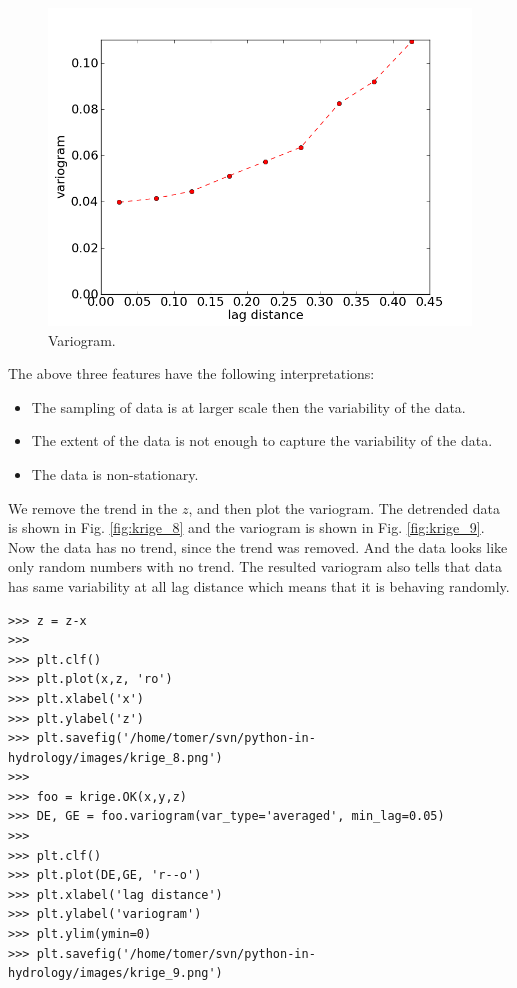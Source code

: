 \documentclass[10pt]{book}
\begin{document}
\beforefig
\begin{figure}[h!]
  \centering
    \includegraphics[scale=0.5]{images/krige_7.png}
  \caption{Variogram.}
   \label{fig:krige_7}
\end{figure}
\afterfig

The above three features have the following interpretations:

\begin{itemize}
\item The sampling of data is at larger scale then the variability of the data. \\
\item The extent of the data is not enough to capture the variability of the data. \\
\item The data is non-stationary. \\
\end{itemize}

We remove the trend in the $z$, and then plot the variogram. The detrended data is shown in Fig. \ref{fig:krige_8} and the variogram is shown in Fig. \ref{fig:krige_9}. Now the data has no trend, since the trend was removed. And the data looks like only random numbers with no trend. The resulted variogram also tells that data has same variability at all lag distance which means that it is behaving randomly. 

\beforeverb \begin{verbatim}
>>> z = z-x
>>> 
>>> plt.clf()
>>> plt.plot(x,z, 'ro')
>>> plt.xlabel('x')
>>> plt.ylabel('z')
>>> plt.savefig('/home/tomer/svn/python-in-hydrology/images/krige_8.png')
>>> 
>>> foo = krige.OK(x,y,z)
>>> DE, GE = foo.variogram(var_type='averaged', min_lag=0.05)
>>> 
>>> plt.clf()
>>> plt.plot(DE,GE, 'r--o')
>>> plt.xlabel('lag distance')
>>> plt.ylabel('variogram')
>>> plt.ylim(ymin=0)
>>> plt.savefig('/home/tomer/svn/python-in-hydrology/images/krige_9.png')
\end{verbatim} \afterverb
\end{document}
